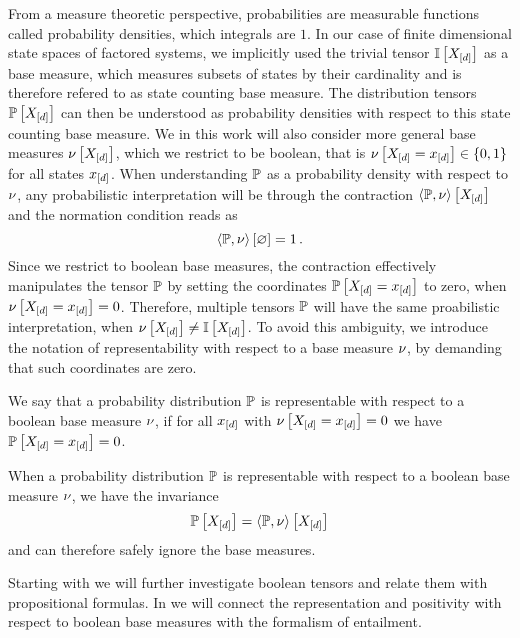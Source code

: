 From a measure theoretic perspective, probabilities are measurable functions called probability densities, which integrals are $1$. %
In our case of finite dimensional state spaces of factored systems, we implicitly used the trivial tensor $\mathbb{I}\left[X_{[d]}\right]$ as a base measure, which measures subsets of states by their cardinality and is therefore refered to as state counting base measure.
The distribution tensors $\mathbb{P}\left[X_{[d]}\right]$ can then be understood as probability densities with respect to this state counting base measure.
We in this work will also consider more general base measures $\nu\left[X_{[d]}\right]$, which we restrict to be boolean, that is $\nu\left[X_{[d]}=x_{[d]}\right]\in\{0,1\}$ for all states $x_{[d]}$.
When understanding $\mathbb{P}$ as a probability density with respect to $\nu$, any probabilistic interpretation will be through the contraction $\left\langle \mathbb{P},\nu\right\rangle \left[ X_{[d]} \right]$ and the normation condition reads as
	\[ \left\langle \mathbb{P},\nu\right\rangle \left[ \varnothing \right] = 1 \, . \]
Since we restrict to boolean base measures, the contraction effectively manipulates the tensor $\mathbb{P}$ by setting the coordinates $\mathbb{P}\left[X_{[d]}=x_{[d]}\right]$ to zero, when $\nu\left[X_{[d]}=x_{[d]}\right]=0$.
Therefore, multiple tensors $\mathbb{P}$ will have the same proabilistic interpretation, when $\nu\left[X_{[d]}\right]\neq\mathbb{I}\left[X_{[d]}\right]$.
To avoid this ambiguity, we introduce the notation of representability with respect to a base measure $\nu$, by demanding that such coordinates are zero.

\begin{definition}\label{def:representationBaseMeasure}
	We say that a probability distribution $\mathbb{P}$ is representable with respect to a boolean base measure $\nu$, if for all $x_{[d]}$ with $\nu\left[X_{[d]}=x_{[d]}\right]=0$ we have $\mathbb{P}\left[X_{[d]}=x_{[d]}\right]=0$.
\end{definition}

When a probability distribution $\mathbb{P}$ is representable with respect to a boolean base measure $\nu$, we have the invariance
	\[ \mathbb{P}\left[X_{[d]}\right] =  \left\langle \mathbb{P},\nu\right\rangle \left[ X_{[d]} \right] \]
and can therefore safely ignore the base measures.

Starting with  we will further investigate boolean tensors and relate them with propositional formulas.
In  we will connect the representation and positivity with respect to boolean base measures with the formalism of entailment.

